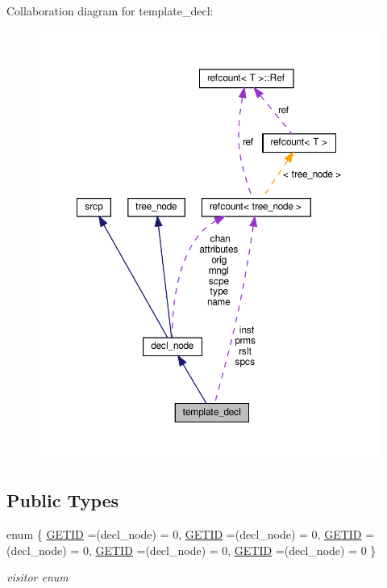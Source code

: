Collaboration diagram for template\+\_\+decl\+:
\nopagebreak
\begin{figure}[H]
\begin{center}
\leavevmode
\includegraphics[width=350pt]{d4/daf/structtemplate__decl__coll__graph}
\end{center}
\end{figure}
\subsection*{Public Types}
\begin{DoxyCompactItemize}
\item 
enum \{ \newline
\hyperlink{structtemplate__decl_a8ec7045d377d741033345ff1c3bccf9cace556358a018aed64b4a07cbd0cf0447}{G\+E\+T\+ID} =(decl\+\_\+node) = 0, 
\hyperlink{structtemplate__decl_a8ec7045d377d741033345ff1c3bccf9cace556358a018aed64b4a07cbd0cf0447}{G\+E\+T\+ID} =(decl\+\_\+node) = 0, 
\hyperlink{structtemplate__decl_a8ec7045d377d741033345ff1c3bccf9cace556358a018aed64b4a07cbd0cf0447}{G\+E\+T\+ID} =(decl\+\_\+node) = 0, 
\hyperlink{structtemplate__decl_a8ec7045d377d741033345ff1c3bccf9cace556358a018aed64b4a07cbd0cf0447}{G\+E\+T\+ID} =(decl\+\_\+node) = 0, 
\newline
\hyperlink{structtemplate__decl_a8ec7045d377d741033345ff1c3bccf9cace556358a018aed64b4a07cbd0cf0447}{G\+E\+T\+ID} =(decl\+\_\+node) = 0
 \}\begin{DoxyCompactList}\small\item\em visitor enum \end{DoxyCompactList}
\end{DoxyCompactItemize}

